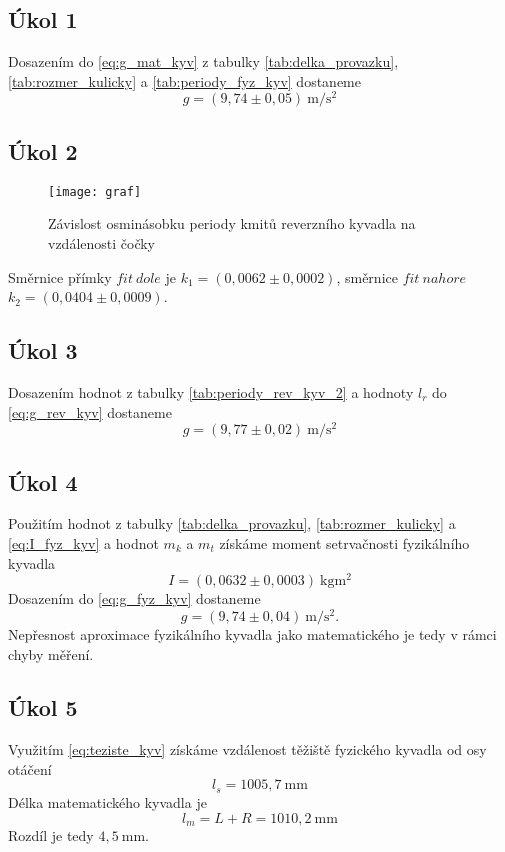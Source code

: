 \documentclass[protokol.tex]{subfiles}
\begin{document}
\subsection*{Úkol 1}
Dosazením do \eqref{eq:g_mat_kyv} z tabulky \ref{tab:delka_provazku}, \ref{tab:rozmer_kulicky} a \ref{tab:periody_fyz_kyv} dostaneme
$$ g = (9,74 \pm 0,05) \ \si{\metre\per\square\second} $$

\subsection*{Úkol 2}

\begin{figure}[H]
\centering
\texttt{[image: graf]}
\caption{Závislost osminásobku periody kmitů reverzního kyvadla na vzdálenosti čočky}
\end{figure}

Směrnice přímky $fit\ dole$ je $k_1 = (0,0062 \pm 0,0002)$, směrnice $fit\ nahore$ $k_2 = (0,0404 \pm 0,0009)$.

\subsection*{Úkol 3}
Dosazením hodnot z tabulky \ref{tab:periody_rev_kyv_2} a hodnoty $l_r$ do \eqref{eq:g_rev_kyv} dostaneme
$$ g = (9,77 \pm 0,02) \ \si{\metre\per\square\second} $$

\subsection*{Úkol 4}
Použitím hodnot z tabulky \ref{tab:delka_provazku}, \ref{tab:rozmer_kulicky} a \eqref{eq:I_fyz_kyv} a hodnot $m_k$ a $m_t$ získáme moment setrvačnosti fyzikálního kyvadla 
$$ I = (0,0632 \pm 0,0003) \ \si{\kilo\gram\metre\squared} $$
Dosazením do \eqref{eq:g_fyz_kyv} dostaneme
$$ g = (9,74 \pm 0,04) \ \si{\metre\per\square\second}.$$
Nepřesnost aproximace fyzikálního kyvadla jako matematického je tedy v rámci chyby měření.

\subsection*{Úkol 5}
Využitím \eqref{eq:teziste_kyv} získáme vzdálenost těžiště fyzického kyvadla od osy otáčení
$$ l_s = 1005,7 \ \si{\milli\metre}$$
Délka matematického kyvadla je 
$$ l_m = L + R = 1010,2 \ \si{\milli\metre} $$
Rozdíl je tedy $4,5 \ \si{\milli\metre}$.
\end{document}
